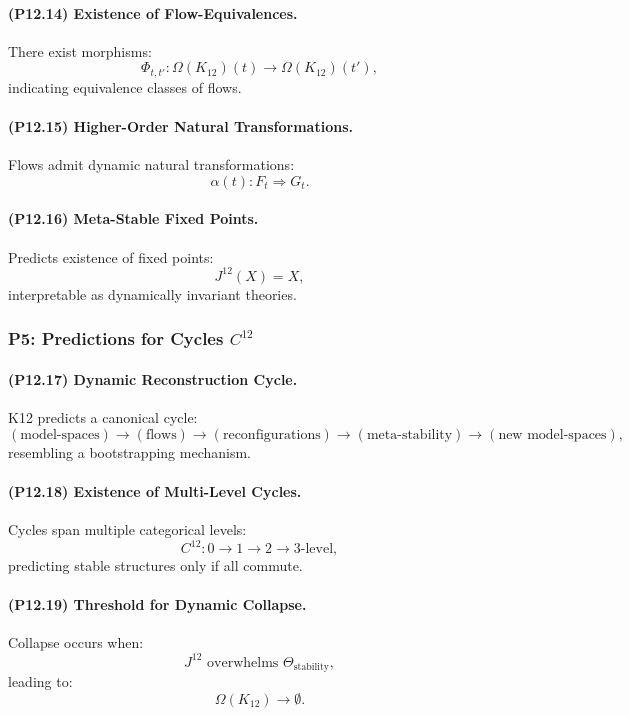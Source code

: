 \paragraph{(P12.14) Existence of Flow-Equivalences.}
There exist morphisms:
\[
\Phi_{t,t'}: \Omega(K_{12})(t) \to \Omega(K_{12})(t'),
\]
indicating equivalence classes of flows.

\paragraph{(P12.15) Higher-Order Natural Transformations.}
Flows admit dynamic natural transformations:
\[
\alpha(t): F_t \Rightarrow G_t.
\]

\paragraph{(P12.16) Meta-Stable Fixed Points.}
Predicts existence of fixed points:
\[
J^{12}(X) = X,
\]
interpretable as dynamically invariant theories.

\subsubsection{P5: Predictions for Cycles $C^{12}$}

\paragraph{(P12.17) Dynamic Reconstruction Cycle.}
K12 predicts a canonical cycle:
\[
(\text{model-spaces}) \to 
(\text{flows}) \to 
(\text{reconfigurations}) \to 
(\text{meta-stability}) \to 
(\text{new model-spaces}),
\]
resembling a bootstrapping mechanism.

\paragraph{(P12.18) Existence of Multi-Level Cycles.}
Cycles span multiple categorical levels:
\[
C^{12}: 0 \to 1 \to 2 \to 3\text{-level},
\]
predicting stable structures only if all commute.

\paragraph{(P12.19) Threshold for Dynamic Collapse.}
Collapse occurs when:
\[
J^{12} \text{ overwhelms } \Theta_{\mathrm{stability}},
\]
leading to:
\[
\Omega(K_{12}) \to \emptyset.
\]

